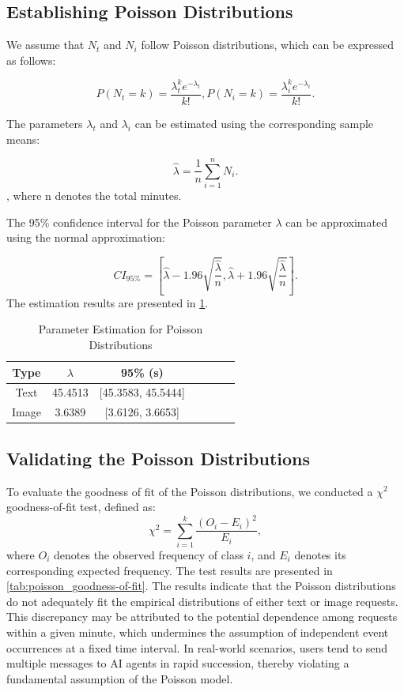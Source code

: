 \documentclass[10pt,a4paper]{article}
\begin{document}
	\subsection{Establishing Poisson Distributions}
	We assume that $N_t$ and $N_i$ follow Poisson distributions,
	which can be expressed as follows:
	
	\[
	P(N_t=k) = \frac{\lambda_t^k e^{-\lambda_t}}{k!},
	P(N_i=k) = \frac{\lambda_i^k e^{-\lambda_i}}{k!}.
	\]
	
	The parameters $\lambda_t$ and $\lambda_i$ can be estimated
	using the corresponding sample means:
	
	\[
	\hat{\lambda} = \frac{1}{n}\sum_{i=1}^{n}N_i.
	\], where n denotes the total minutes.
	
	The 95\% confidence interval for the Poisson parameter
	$\lambda$ can be approximated using the normal approximation:
	
	\[
	CI_{95\%} =
	\left[
	\hat{\lambda} - 1.96\sqrt{\frac{\hat{\lambda}}{n}},
	\hat{\lambda} + 1.96\sqrt{\frac{\hat{\lambda}}{n}}
	\right].
	\]
	The estimation results are presented in
	\cref{tab:poisson_parameters_estimation}.
	
	\begin{table}[H]
		\centering
		\caption{Parameter Estimation for Poisson Distributions}
		\label{tab:poisson_parameters_estimation}
		\begin{tabular}{ccccccc}
			\hline
			Type & $ \lambda $ & 95\% (s)  \\
			\hline
			Text  & 45.4513 & [45.3583, 45.5444]  \\
			Image & 3.6389 & [3.6126, 3.6653]  \\
			\hline
		\end{tabular}
	\end{table}
	

	\subsection{Validating the Poisson Distributions}
	To evaluate the goodness of fit of the Poisson distributions, we conducted a $\chi^2$ goodness-of-fit test, defined as:
	\[
	\chi^2 = \sum_{i=1}^{k} \frac{(O_i - E_i)^2}{E_i},
	\]
	where $O_i$ denotes the observed frequency of class $i$, and $E_i$ denotes its corresponding expected frequency. The test results are presented in \cref{tab:poisson_goodness-of-fit}. The results indicate that the Poisson distributions do not adequately fit the empirical distributions of either text or image requests. This discrepancy may be attributed to the potential dependence among requests within a given minute, which undermines the assumption of independent event occurrences at a fixed time interval. In real-world scenarios, users tend to send multiple messages to AI agents in rapid succession, thereby violating a fundamental assumption of the Poisson model.
\end{document}
